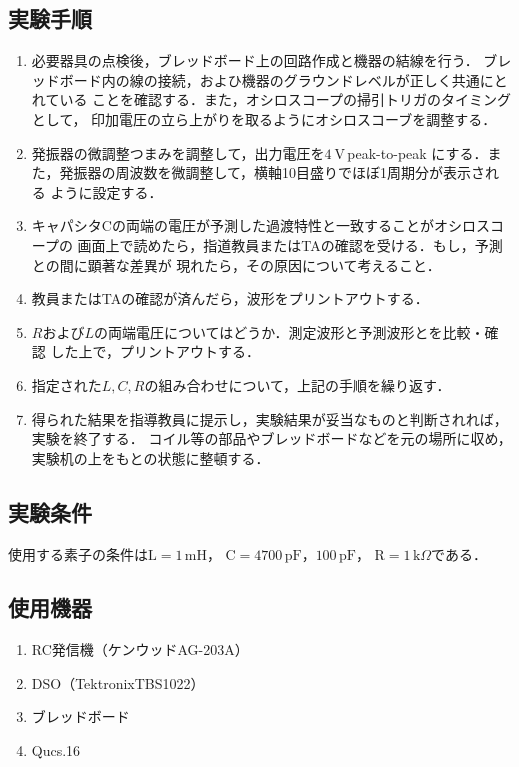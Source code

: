 \subsection{実験手順}    
    \begin{enumerate}
        \item 必要器具の点検後，ブレッドボード上の回路作成と機器の結線を行う．
        ブレッドボード内の線の接続，およひ機器のグラウンドレベルが正しく共通にとれている
        ことを確認する．また，オシロスコープの掃引トリガのタイミングとして，
        印加電圧の立ら上がりを取るようにオシロスコーブを調整する．

        \item  発振器の微調整つまみを調整して，出力電圧を$4 \mathrm{~V}$\,peak-to-peak
        にする．また，発振器の周波数を微調整して，横軸10目盛りでほぼ1周期分が表示される
        ように設定する．

        \item キャパシタCの両端の電圧が予測した過渡特性と一致することがオシロスコープの
        画面上で読めたら，指道教員またはTAの確認を受ける．もし，予測との間に顕著な差異が
        現れたら，その原因について考えること．

        \item 教員またはTAの確認が済んだら，波形をプリントアウトする．

        \item $R$および$L$の両端電圧についてはどうか．測定波形と予測波形とを比較・確認
        した上で，プリントアウトする．

        \item 指定された$L, C, R$の組み合わせについて，上記の手順を繰り返す．
        
        \item 得られた結果を指導教員に提示し，実験結果が妥当なものと判断されれば，実験を終了する．
        コイル等の部品やブレッドボードなどを元の場所に収め，実験机の上をもとの状態に整頓する．
    \end{enumerate}

\newpage

\subsection{実験条件}
使用する素子の条件は$\mathrm{L}=1\,\mathrm{mH}$，
$\mathrm{C}=4700\,\mathrm{pF}，100\,\mathrm{pF}$，
$\mathrm{R}=1\,\mathrm{k}\Omega$である．

\subsection{使用機器}
\begin{enumerate}
    \item RC発信機（ケンウッド\quad AG-203A）
    \item DSO（Tektronix\quad TBS1022）
    \item ブレッドボード
    \item Qucs.16
\end{enumerate}

